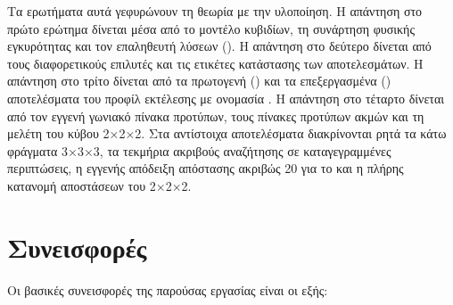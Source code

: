 Τα ερωτήματα αυτά γεφυρώνουν τη θεωρία με την υλοποίηση. Η απάντηση στο πρώτο ερώτημα δίνεται μέσα από το μοντέλο κυβιδίων, τη συνάρτηση φυσικής εγκυρότητας και τον επαληθευτή λύσεων (). Η απάντηση στο δεύτερο δίνεται από τους διαφορετικούς επιλυτές και τις ετικέτες κατάστασης των αποτελεσμάτων. Η απάντηση στο τρίτο δίνεται από τα πρωτογενή () και τα επεξεργασμένα () αποτελέσματα του προφίλ εκτέλεσης με ονομασία . Η απάντηση στο τέταρτο δίνεται από τον εγγενή γωνιακό πίνακα προτύπων, τους πίνακες προτύπων ακμών και τη μελέτη του κύβου 2×2×2. Στα αντίστοιχα αποτελέσματα διακρίνονται ρητά τα κάτω φράγματα 3×3×3, τα τεκμήρια ακριβούς αναζήτησης σε καταγεγραμμένες περιπτώσεις, η εγγενής απόδειξη απόστασης ακριβώς 20 για το  και η πλήρης κατανομή αποστάσεων του 2×2×2.

\section{Συνεισφορές}\label{sec:intro-contributions}
Οι βασικές συνεισφορές της παρούσας εργασίας είναι οι εξής:

